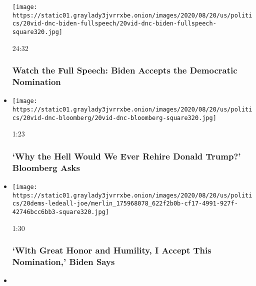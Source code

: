 \begin{itemize}
  \texttt{[image: https://static01.graylady3jvrrxbe.onion/images/2020/08/20/us/politics/20vid-dnc-biden-fullspeech/20vid-dnc-biden-fullspeech-square320.jpg]}

  24:32

  \hypertarget{watch-the-full-speech-biden-accepts-the-democratic-nomination}{%
  \subsubsection{Watch the Full Speech: Biden Accepts the Democratic
  Nomination}\label{watch-the-full-speech-biden-accepts-the-democratic-nomination}}
\item
  \href{https://www.nytimes3xbfgragh.onion/video/us/elections/100000007299747/michael-bloomberg-speaks-dnc.html?action=click\&module=video-series-bar\&region=header\&pgtype=Article\&playlistId=video/2020-Elections}{}

  \texttt{[image: https://static01.graylady3jvrrxbe.onion/images/2020/08/20/us/politics/20vid-dnc-bloomberg/20vid-dnc-bloomberg-square320.jpg]}

  1:23

  \hypertarget{why-the-hell-would-we-ever-rehire-donald-trump-bloomberg-asks}{%
  \subsubsection{`Why the Hell Would We Ever Rehire Donald Trump?'
  Bloomberg
  Asks}\label{why-the-hell-would-we-ever-rehire-donald-trump-bloomberg-asks}}
\item
  \href{https://www.nytimes3xbfgragh.onion/video/us/elections/100000007299760/joe-biden-speaks-dnc.html?action=click\&module=video-series-bar\&region=header\&pgtype=Article\&playlistId=video/2020-Elections}{}

  \texttt{[image: https://static01.graylady3jvrrxbe.onion/images/2020/08/20/us/politics/20dems-ledeall-joe/merlin\_175968078\_622f2b0b-cf17-4991-927f-42746bcc6bb3-square320.jpg]}

  1:30

  \hypertarget{with-great-honor-and-humility-i-accept-this-nomination-biden-says}{%
  \subsubsection{`With Great Honor and Humility, I Accept This
  Nomination,' Biden
  Says}\label{with-great-honor-and-humility-i-accept-this-nomination-biden-says}}
\item
  \href{https://www.nytimes3xbfgragh.onion/video/us/elections/100000007299812/pete-buttigieg-speaks-dnc.html?action=click\&module=video-series-bar\&region=header\&pgtype=Article\&playlistId=video/2020-Elections}{}


\end{itemize}
